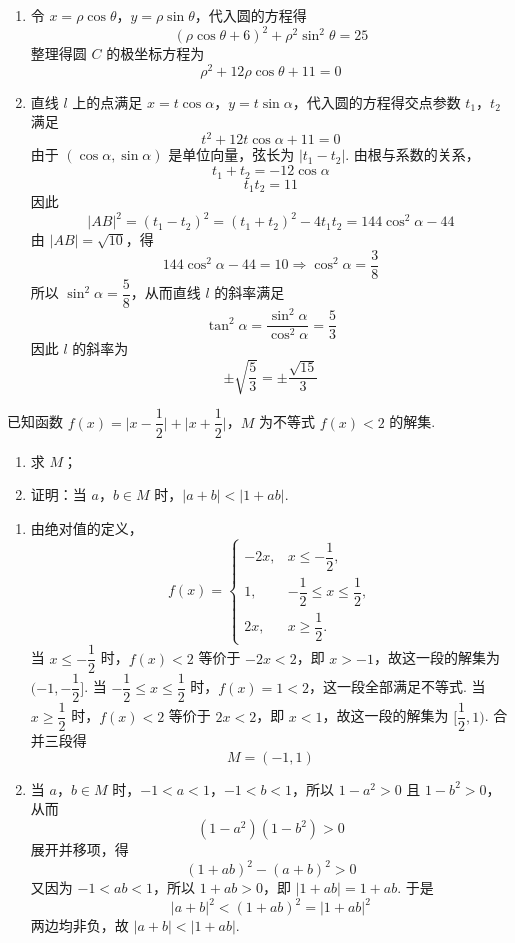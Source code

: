\begin{solution}
\begin{enumerate}
\item 令 \(x=\rho\cos\theta\)，\(y=\rho\sin\theta\)，代入圆的方程得
\[
(\rho\cos\theta+6)^2+\rho^2\sin^2\theta=25
\]
整理得圆 \(C\) 的极坐标方程为
\[
\rho^2+12\rho\cos\theta+11=0
\]

\item 直线 \(l\) 上的点满足 \(x=t\cos\alpha\)，\(y=t\sin\alpha\)，代入圆的方程得交点参数 \(t_1\)，\(t_2\) 满足
\[
t^2+12t\cos\alpha+11=0
\]
由于 \((\cos\alpha,\sin\alpha)\) 是单位向量，弦长为 \(\lvert t_1-t_2\rvert\). 由根与系数的关系，
\[
t_1+t_2=-12\cos\alpha
\]
\[
t_1t_2=11
\]
因此
\[
\lvert AB\rvert^2=(t_1-t_2)^2=(t_1+t_2)^2-4t_1t_2=144\cos^2\alpha-44
\]
由 \(\lvert AB\rvert=\sqrt{10}\)，得
\[
144\cos^2\alpha-44=10\Longrightarrow \cos^2\alpha=\dfrac38
\]
所以 \(\sin^2\alpha=\dfrac58\)，从而直线 \(l\) 的斜率满足
\[
\tan^2\alpha=\dfrac{\sin^2\alpha}{\cos^2\alpha}=\dfrac53
\]
因此 \(l\) 的斜率为
\[
\pm\sqrt{\dfrac53}=\pm\dfrac{\sqrt{15}}{3}
\]
\end{enumerate}
\end{solution}


\begin{problem}
已知函数 \(f(x)=\lvert x-\dfrac12\rvert+\lvert x+\dfrac12\rvert\)，\(M\) 为不等式 \(f(x)<2\) 的解集.
\begin{enumerate}
\item 求 \(M\)；
\item 证明：当 \(a\)，\(b\in M\) 时，\(\lvert a+b\rvert<\lvert 1+ab\rvert\).
\end{enumerate}
\end{problem}

\begin{solution}
\begin{enumerate}
\item 由绝对值的定义，
\[
f(x)=\begin{cases}
-2x,&x\leq-\dfrac12,\\
1,&-\dfrac12\leq x\leq\dfrac12,\\
2x,&x\geq\dfrac12.
\end{cases}
\]
当 \(x\leq-\dfrac12\) 时，\(f(x)<2\) 等价于 \(-2x<2\)，即 \(x>-1\)，故这一段的解集为 \((-1,-\dfrac12]\). 当 \(-\dfrac12\leq x\leq\dfrac12\) 时，\(f(x)=1<2\)，这一段全部满足不等式. 当 \(x\geq\dfrac12\) 时，\(f(x)<2\) 等价于 \(2x<2\)，即 \(x<1\)，故这一段的解集为 \([\dfrac12,1)\). 合并三段得
\[
M=(-1,1)
\]

\item 当 \(a\)，\(b\in M\) 时，\(-1<a<1\)，\(-1<b<1\)，所以 \(1-a^2>0\) 且 \(1-b^2>0\)，从而
\[
(1-a^2)(1-b^2)>0
\]
展开并移项，得
\[
(1+ab)^2-(a+b)^2>0
\]
又因为 \(-1<ab<1\)，所以 \(1+ab>0\)，即 \(\lvert1+ab\rvert=1+ab\). 于是
\[
\lvert a+b\rvert^2<(1+ab)^2=\lvert1+ab\rvert^2
\]
两边均非负，故 \(\lvert a+b\rvert<\lvert1+ab\rvert\).
\end{enumerate}
\end{solution}
